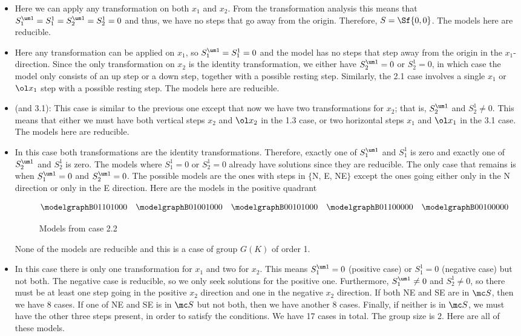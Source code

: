 \begin{itemize}
\item [Case 1.1:] Here we can apply any transformation on both $x_1$ and $x_2$. From the transformation analysis this means that $S_1^{\um 1} = S_1^1 = S_2^{\um 1} = S_2^1 = 0$ and thus, we have no steps that go away from the origin. Therefore, $S = \Sf{0,0}$. The models here are reducible.
\item[Case 1.2:] Here any transformation can be applied on $x_1$, so $S_1^{\um 1} = S_1^1 = 0$ and the model has no steps that step away from the origin in the $x_1$-direction. Since the only transformation on $x_2$ is the identity transformation, we either have $S_2^{\um 1} = 0$ or $S_2^1 = 0$, in which case the model only consists of an up step or a down step, together with a possible resting step. Similarly, the 2.1 case involves a single $x_1$ or $\ol x_1$ step with a possible resting step. The models here are reducible.
\item[Case 1.3:] (and 3.1): This case is similar to the previous one except that now we have two transformations for $x_2$; that is, $S_2^{\um 1}$ and $S_2^1 \neq 0$. This means that either we must have both vertical steps $x_2$ and $\ol x_2$ in the 1.3 case, or two horizontal steps $x_1$ and $\ol x_1$ in the 3.1 case. The models here are reducible.
\item[Case 2.2:] In this case both transformations are the identity transformations. Therefore, exactly one of $S_1^{\um 1}$ and $S_1^1$ is zero and exactly one of $S_2^{\um 1}$ and $S_2^1$ is zero. The models where $S_1^1 = 0$ or $S_2^1 = 0$ already have solutions since they are reducible. The only case that remains is when $S_1^{\um 1} = 0$ and $S_2^{\um 1} = 0$. The possible models are the ones with steps in $\{$N, E, NE$\}$ except the ones going either only in the N direction or only in the E direction. Here are the models in the positive quadrant
\begin{figure}[H]
    \centering
\[
	\modelgraphB 01101000\quad\modelgraphB 01001000\quad \modelgraphB 00101000 \quad \modelgraphB 01100000 \quad \modelgraphB 00100000
\]
    \caption{Models from case 2.2}
\end{figure}
None of the models are reducible and this is a case of group $G(K)$ of order 1.
\item[Case 2.3:] In this case there is only one transformation for $x_1$ and two for $x_2$. This means $S_1^{\um 1} = 0$ (positive case) or $S_1^{1} = 0$ (negative case) but not both. The negative case is reducible, so we only seek solutions for the positive one. Furthermore, $S_1^{\um 1} \neq 0$ and $S_2^1 \neq 0$, so there must be at least one step going in the positive $x_2$ direction and one in the negative $x_2$ direction. If both NE and SE are in $\mc S$, then we have 8 cases. If one of NE and SE is in $\mc S$ but not both, then we have another 8 cases. Finally, if neither is in $\mc S$, we must have the other three steps present, in order to satisfy the conditions. We have 17 cases in total. The group size is 2. Here are all of these models.

\end{itemize}
